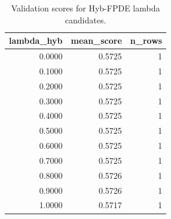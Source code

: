 \begin{table}[t]
\caption{Validation scores for Hyb-FPDE lambda candidates.}
\label{tab:lambda_distribution_computed}
\centering
\begin{tabular}{rrr}
\toprule
lambda\_hyb & mean\_score & n\_rows \\
\midrule
0.0000 & 0.5725 & 1 \\
0.1000 & 0.5725 & 1 \\
0.2000 & 0.5725 & 1 \\
0.3000 & 0.5725 & 1 \\
0.4000 & 0.5725 & 1 \\
0.5000 & 0.5725 & 1 \\
0.6000 & 0.5725 & 1 \\
0.7000 & 0.5725 & 1 \\
0.8000 & 0.5726 & 1 \\
0.9000 & 0.5726 & 1 \\
1.0000 & 0.5717 & 1 \\
\bottomrule
\end{tabular}

\end{table}

